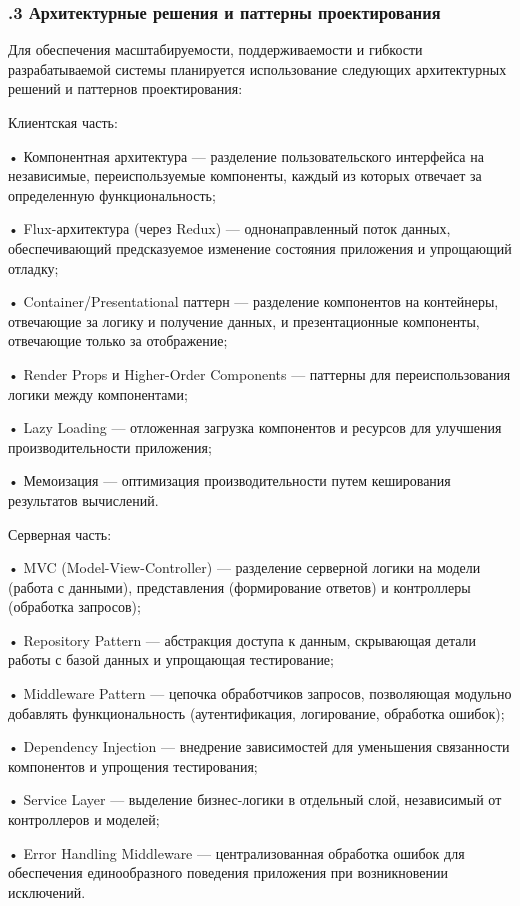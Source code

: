 \subtitlespace

\subsubsection*{ 
  \gostTitleFont
  .3 Архитектурные решения и паттерны проектирования
} 

\subtitlespace

{\gostFont

  \par \redline Для обеспечения масштабируемости, поддерживаемости и гибкости разрабатываемой системы планируется использование следующих архитектурных решений и паттернов проектирования:

  \par \redline Клиентская часть:

  \par \redline • Компонентная архитектура — разделение пользовательского интерфейса на независимые, переиспользуемые компоненты, каждый из которых отвечает за определенную функциональность;
  \par \redline • Flux-архитектура (через Redux) — однонаправленный поток данных, обеспечивающий предсказуемое изменение состояния приложения и упрощающий отладку;
  \par \redline • Container/Presentational паттерн — разделение компонентов на контейнеры, отвечающие за логику и получение данных, и презентационные компоненты, отвечающие только за отображение;
  \par \redline • Render Props и Higher-Order Components — паттерны для переиспользования логики между компонентами;
  \par \redline • Lazy Loading — отложенная загрузка компонентов и ресурсов для улучшения производительности приложения;
  \par \redline • Мемоизация — оптимизация производительности путем кеширования результатов вычислений.

  \par \redline Серверная часть:

  \par \redline • MVC (Model-View-Controller) — разделение серверной логики на модели (работа с данными), представления (формирование ответов) и контроллеры (обработка запросов);
  \par \redline • Repository Pattern — абстракция доступа к данным, скрывающая детали работы с базой данных и упрощающая тестирование;
  \par \redline • Middleware Pattern — цепочка обработчиков запросов, позволяющая модульно добавлять функциональность (аутентификация, логирование, обработка ошибок);
  \par \redline • Dependency Injection — внедрение зависимостей для уменьшения связанности компонентов и упрощения тестирования;
  \par \redline • Service Layer — выделение бизнес-логики в отдельный слой, независимый от контроллеров и моделей;
  \par \redline • Error Handling Middleware — централизованная обработка ошибок для обеспечения единообразного поведения приложения при возникновении исключений.

}
